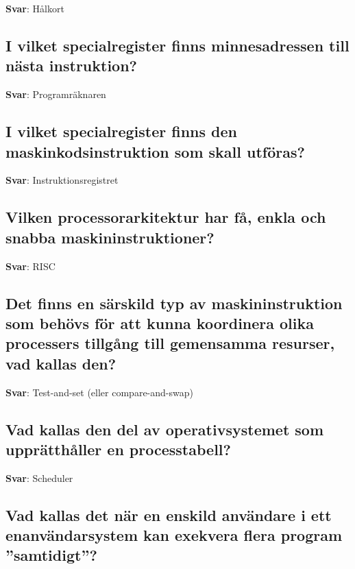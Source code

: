 \documentclass[a4paper,11pt,oneside]{article}
\begin{document}
\begin{sloppypar}
\textbf{Svar}: H\r{a}lkort



\subsection{I vilket specialregister finns minnesadressen till n\"asta instruktion?}

\label{q:4:sa:sv:True}

\textbf{Svar}: Programr\"aknaren



\subsection{I vilket specialregister finns den maskinkodsinstruktion som skall utf\"oras?}

\label{q:5:sa:sv:True}

\textbf{Svar}: Instruktionsregistret



\subsection{Vilken processorarkitektur har f\r{a}, enkla och snabba maskininstruktioner?}

\label{q:6:sa:sv:True}

\textbf{Svar}: RISC



\subsection{Det finns en s\"arskild typ av maskininstruktion som beh\"ovs f\"or att kunna koordinera olika processers tillg\r{a}ng till gemensamma resurser, vad kallas den?}

\label{q:7:sa:sv:True}

\textbf{Svar}: Test-and-set (eller compare-and-swap)



\subsection{Vad kallas den del av operativsystemet som uppr\"atth\r{a}ller en processtabell?}

\label{q:8:sa:sv:True}

\textbf{Svar}: Scheduler



\subsection{Vad kallas det n\"ar en enskild anv\"andare i ett enanv\"andarsystem kan exekvera flera program {\textquotedblright}samtidigt{\textquotedblright}?}


\end{sloppypar}
\end{document}

